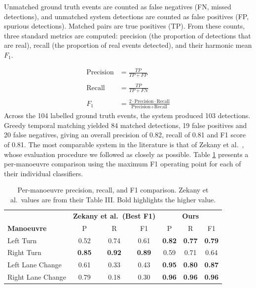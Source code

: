 \documentclass{article}
\begin{document}
Unmatched ground truth events are counted as false negatives (FN, missed detections), and unmatched system detections are counted as false positives (FP, spurious detections). Matched pairs are true positives (TP). From these counts, three standard metrics are computed: precision (the proportion of detections that are real), recall
(the proportion of real events detected), and their harmonic mean $F_1$.

\begin{align*}
\text{Precision} &= \frac{TP}{TP + FP} \\\\
\text{Recall}    &= \frac{TP}{TP + FN} \\\\
F_1              &= \frac{2 \cdot \text{Precision} \cdot \text{Recall}}{\text{Precision} + \text{Recall}}
\end{align*}
Across the 104 labelled ground truth events, the system produced 103 detections. Greedy temporal matching yielded 84 matched detections, 19 false positives and 20 false negatives, giving an overall precision of 0.82, recall of 0.81 and F1 score of 0.81. The most comparable system in the literature is that of Zekany et al.\ \cite{zekany2022finding}, whose evaluation procedure we followed as closely as possible. Table \ref{tab:f1_comparison} presents a per-manoeuvre comparison using the maximum F1 operating point for each of their individual classifiers.

\begin{table}[H]
\centering
\small
\begin{tabular}{|l|ccc|ccc|}
\hline
 & \multicolumn{3}{c|}{\textbf{Zekany et al.\ (Best F1) \cite{zekany2022finding}}} & \multicolumn{3}{c|}{\textbf{Ours}} \\
\textbf{Manoeuvre} & P & R & F1 & P & R & F1 \\
\hline
Left Turn      & 0.52 & 0.74 & 0.61 & \textbf{0.82} & \textbf{0.77} & \textbf{0.79} \\
Right Turn     & \textbf{0.85} & \textbf{0.92} & \textbf{0.89} & 0.59 & 0.71 & 0.64 \\
Left Lane Change  & 0.61 & 0.33 & 0.43 & \textbf{0.95} & \textbf{0.80} & \textbf{0.87} \\
Right Lane Change & 0.79 & 0.18 & 0.30 & \textbf{0.96} & \textbf{0.96} & \textbf{0.96} \\
\hline
\end{tabular}
\caption{Per-manoeuvre precision, recall, and F1 comparison. Zekany et al.\ values are from their Table III. Bold highlights the higher value.}
\label{tab:f1_comparison}
\end{table}
\end{document}
